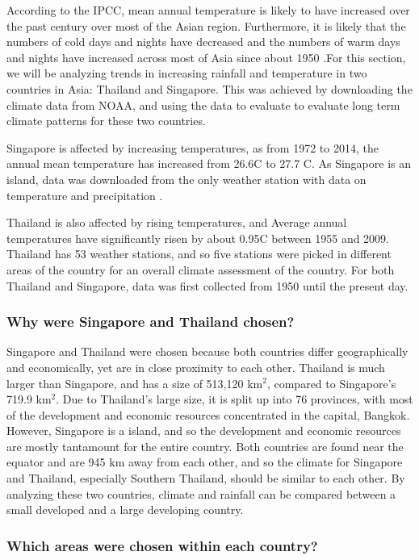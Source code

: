 According to the IPCC, mean annual temperature is likely to have increased over the past century over most of the Asian region. Furthermore, it is likely that the numbers of cold days and nights have decreased and the numbers of warm days and nights have increased across most of Asia since about 1950 \citep{hijioka2014chapter}.For this section, we will be analyzing trends in increasing rainfall and temperature in two countries in Asia: Thailand and Singapore. This was achieved by downloading the climate data from NOAA, and using the data to evaluate to evaluate long term climate patterns for these two countries. 

Singapore is affected by increasing temperatures, as from 1972 to 2014, the annual mean temperature has increased from 26.6\degree C to 27.7 \degree C. As Singapore is an island, data was downloaded from the only weather station with data on temperature and precipitation \citep{singaporeclimatechange}. 

Thailand is also affected by rising temperatures, and Average annual temperatures have significantly risen by about 0.95\degree C between 1955 and 2009. Thailand has 53 weather stations, and so five stations were picked in different areas of the country for an overall climate assessment of the country. For  both Thailand and Singapore, data was first collected from 1950 until the present day. 

\subsubsection{Why were Singapore and Thailand chosen?}

Singapore and Thailand were chosen because both countries differ geographically and economically, yet are in close proximity to each other. Thailand is much larger than Singapore, and has a size of 513,120 km$^2$, compared to Singapore's 719.9 km$^2$. Due to Thailand's large size, it is split up into 76 provinces, with most of the development and economic resources concentrated in the capital, Bangkok. However, Singapore is a island, and so the development and economic resources are mostly tantamount for the entire country. Both countries are found near the equator and are 945 km away from each other, and so the climate for Singapore and Thailand, especially Southern Thailand, should be similar to each other. By analyzing these two countries, climate and rainfall can be compared between a small developed and a large developing country.

\subsubsection{Which areas were chosen within each country?}

